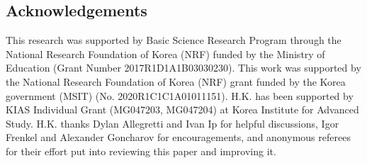\documentclass[pdftex]{sigma}
\numberwithin{equation}{section}
\theoremstyle{definition}
\begin{document}
\subsection*{Acknowledgements}
This research was supported by Basic Science Research Program through the National Research Foundation of Korea (NRF) funded by the Ministry of Education (Grant Number 2017R1D1A1\-B03030230). This work was supported by the National Research Foundation of Korea (NRF) grant funded by the Korea government (MSIT) (No. 2020R1C1C1A01011151). H.K. has been supported by KIAS Individual Grant (MG047203, MG047204) at Korea Institute for Advanced Study. H.K. thanks Dylan Allegretti and Ivan Ip for helpful discussions, Igor Frenkel and Alexander Goncharov for encouragements, and anonymous referees for their effort put into reviewing this paper and improving it.
%
%
\end{document}
